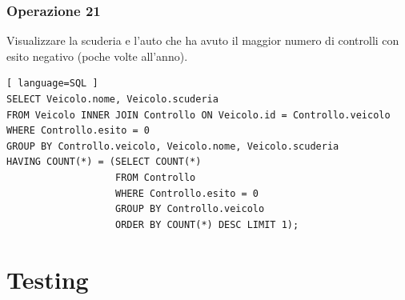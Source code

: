 \documentclass[11pt]{article}
\begin{document}
\subsubsection{Operazione 21}
Visualizzare la scuderia e l'auto che ha avuto il maggior numero di controlli con esito negativo (poche volte all'anno).
\begin{lstlisting}[ language=SQL ]
SELECT Veicolo.nome, Veicolo.scuderia
FROM Veicolo INNER JOIN Controllo ON Veicolo.id = Controllo.veicolo
WHERE Controllo.esito = 0
GROUP BY Controllo.veicolo, Veicolo.nome, Veicolo.scuderia
HAVING COUNT(*) = (SELECT COUNT(*)
                   FROM Controllo
                   WHERE Controllo.esito = 0
                   GROUP BY Controllo.veicolo
                   ORDER BY COUNT(*) DESC LIMIT 1);
\end{lstlisting}


\section{Testing}
\end{document}
